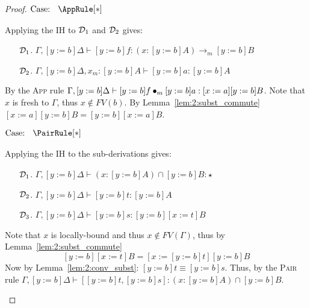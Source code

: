\begin{proof}
    $\text{Case: }\begin{array}{c} \AppRule[*] \end{array}$
    \begin{proofcase}
        Applying the IH to $\mathcal{D}_{1}$ and $\mathcal{D}_{2}$ gives:
        \begin{enumerate}
            \item[$\mathcal{D}_{1}$.] $\Gamma, [y := b]\Delta \vdash [y := b]f : (x : [y := b]A) \to_m [y := b]B$
            \item[$\mathcal{D}_{2}$.] $\Gamma, [y := b]\Delta, x_m : [y := b]A \vdash [y := b]a : [y := b]A$
        \end{enumerate}
        By the \textsc{App} rule $\Gamma, [y := b]\Delta \vdash [y := b]f \bullet_{m} [y := b]a : [x := a][y := b]B$.
        Note that $x$ is fresh to $\Gamma$, thus $x \notin FV(b)$.
        By Lemma~\ref{lem:2:subst_commute} $[x := a][y := b]B = [y := b][x := a]B$.
    \end{proofcase}

    $\text{Case: }\begin{array}{c} \PairRule[*] \end{array}$
    \begin{proofcase}
        Applying the IH to the sub-derivations gives:
        \begin{enumerate}
            \item[$\mathcal{D}_{1}$.] $\Gamma, [y := b]\Delta \vdash (x : [y := b]A) \cap [y := b]B : \star$
            \item[$\mathcal{D}_{2}$.] $\Gamma, [y := b]\Delta \vdash [y := b]t : [y := b]A$
            \item[$\mathcal{D}_{3}$.] $\Gamma, [y := b]\Delta \vdash [y := b]s : [y := b][x := t]B$
        \end{enumerate}
        Note that $x$ is locally-bound and thus $x \notin FV(\Gamma)$, thus by Lemma~\ref{lem:2:subst_commute} $$[y := b][x := t]B = [x := [y := b]t][y := b]B$$
        Now by Lemma~\ref{lem:2:conv_subst}: $[y := b]t \equiv [y := b]s$.
        Thus, by the \textsc{Pair} rule $\Gamma, [y := b]\Delta \vdash [[y := b]t, [y := b]s] : (x : [y := b]A) \cap [y := b]B$.
    \end{proofcase}
\end{proof}

